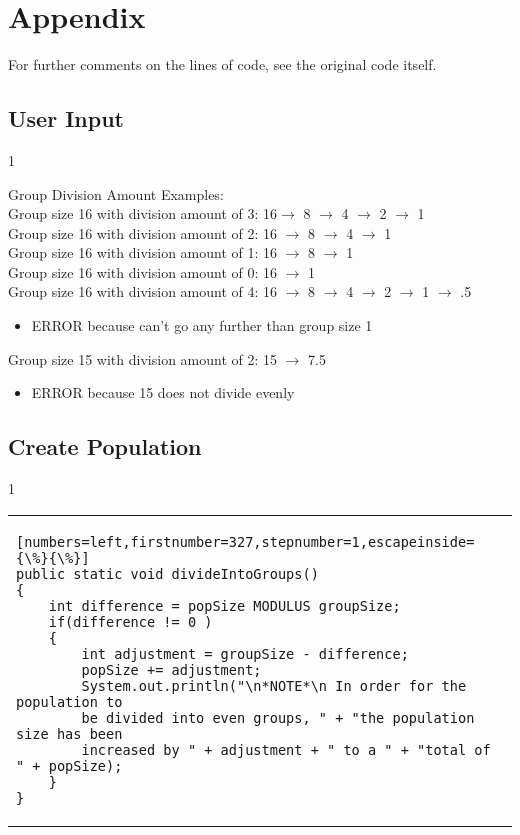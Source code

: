 \documentclass[letterpaper, 10pt,DIV=13]{scrartcl}
\numberwithin{equation}{section} %
\numberwithin{figure}{section} %
\numberwithin{table}{section} %
\begin{document}
\section{Appendix}

For further comments on the lines of code, see the original code itself.

\subsection{User Input}
 1
 \begin{tcolorbox}
	Group Division Amount Examples: \\
		Group size 16 with division amount of 3: 16$\rightarrow$ 8 $\rightarrow$ 4 $\rightarrow$ 2 $\rightarrow$ 1 \\
		Group size 16 with division amount of 2: 16 $\rightarrow$ 8 $\rightarrow$ 4 $\rightarrow$ 1 \\
		Group size 16 with division amount of 1: 16 $\rightarrow$ 8 $\rightarrow$ 1 \\
		Group size 16 with division amount of 0: 16 $\rightarrow$ 1 \\
		Group size 16 with division amount of 4: 16 $\rightarrow$ 8 $\rightarrow$ 4 $\rightarrow$ 2 $\rightarrow$ 1 $\rightarrow$ .5 
		   \begin{itemize}
		       \item ERROR because can't go any further than group size 1  
		   \end{itemize} 
		Group size 15 with division amount of 2: 15 $\rightarrow$ 7.5 
		    \begin{itemize}
		       \item ERROR because 15 does not divide evenly  
		   \end{itemize} 
 \end{tcolorbox}

\subsection{Create Population}
1
\begin{center}
\begin{tabular}{l}
\begin{lstlisting}[numbers=left,firstnumber=327,stepnumber=1,escapeinside={\%}{\%}]
public static void divideIntoGroups()
{
    int difference = popSize MODULUS groupSize;
    if(difference != 0 )
    {
        int adjustment = groupSize - difference;
        popSize += adjustment;
        System.out.println("\n*NOTE*\n In order for the population to
        be divided into even groups, " + "the population size has been
        increased by " + adjustment + " to a " + "total of " + popSize);
    }
}
\end{lstlisting}
\end{tabular}
\end{center}\textbf{}
\end{document}
